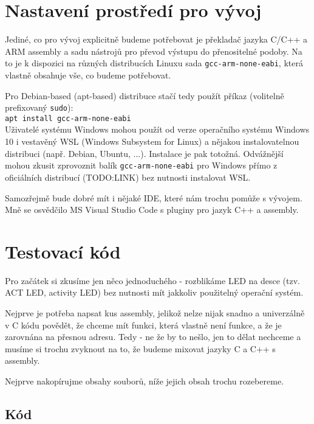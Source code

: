 \documentclass{article}
\begin{document}
\section{Nastavení prostředí pro vývoj}

Jediné, co pro vývoj explicitně budeme potřebovat je překladač jazyka C/C++ a ARM assembly a sadu nástrojů pro převod výstupu do přenositelné podoby. Na to je k dispozici na různých distribucích Linuxu sada \texttt{gcc-arm-none-eabi}, která vlastně obsahuje vše, co budeme potřebovat.

Pro Debian-based (apt-based) distribuce stačí tedy použít příkaz (volitelně prefixovaný \texttt{sudo}):\\

\texttt{apt install gcc-arm-none-eabi}\\

Uživatelé systému Windows mohou použít od verze operačního systému Windows 10 i vestavěný WSL (Windows Subsystem for Linux) a nějakou instalovatelnou distribuci (např. Debian, Ubuntu, ...). Instalace je pak totožná. Odvážnější mohou zkusit zprovoznit balík \texttt{gcc-arm-none-eabi} pro Windows přímo z oficiálních distribucí (TODO:LINK) bez nutnosti instalovat WSL.

Samozřejmě bude dobré mít i nějaké IDE, které nám trochu pomůže s vývojem. Mně se osvědčilo MS Visual Studio Code s pluginy pro jazyk C++ a assembly.



\section{Testovací kód}

Pro začátek si zkusíme jen něco jednoduchého - rozblikáme LED na desce (tzv. ACT LED, activity LED) bez nutnosti mít jakkoliv použitelný operační systém.

Nejprve je potřeba napsat kus assembly, jelikož nelze nijak snadno a univerzálně v C kódu povědět, že chceme mít funkci, která vlastně není funkce, a že je zarovnána na přesnou adresu. Tedy - ne že by to nešlo, jen to dělat nechceme a musíme si trochu zvyknout na to, že budeme mixovat jazyky C a C++ s assembly.

Nejprve nakopírujme obsahy souborů, níže jejich obsah trochu rozebereme.

\subsection{Kód}
\end{document}
